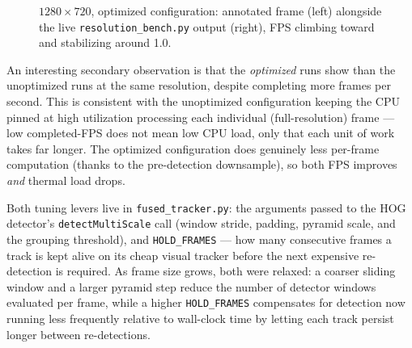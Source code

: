\begin{figure}[H]
\centering
\caption{$1280\times720$, optimized configuration: annotated frame (left) alongside the live \texttt{resolution\_bench.py} output (right), FPS climbing toward and stabilizing around 1.0.}\label{fig:720p-result}
\end{figure}

An interesting secondary observation is that the \emph{optimized} runs
show  than the unoptimized runs at the
same resolution, despite completing more frames per second. This is
consistent with the unoptimized configuration keeping the CPU pinned at
high utilization processing each individual (full-resolution) frame — low
completed-FPS does not mean low CPU load, only that each unit of work
takes far longer. The optimized configuration does genuinely less
per-frame computation (thanks to the pre-detection downsample), so both
FPS improves \emph{and} thermal load drops.


Both tuning levers live in \texttt{fused\_tracker.py}: the arguments passed
to the HOG detector's \texttt{detectMultiScale} call (window stride,
padding, pyramid scale, and the grouping threshold), and
\texttt{HOLD\_FRAMES} — how many consecutive frames a track is kept alive
on its cheap visual tracker before the next expensive re-detection is
required. As frame size grows, both were relaxed: a coarser sliding window
and a larger pyramid step reduce the number of detector windows evaluated
per frame, while a higher \texttt{HOLD\_FRAMES} compensates for detection
now running less frequently relative to wall-clock time by letting each
track persist longer between re-detections.

\begin{table}[H]
\centering
\caption{Detection parameters changed between the unoptimized and optimized runs at each resolution.}
\label{tab:optimization-params}
\end{table}

